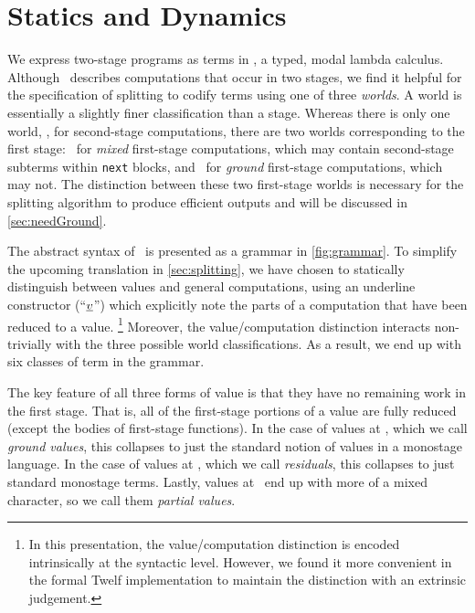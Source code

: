 
\section{\texorpdfstring{\lang}{λ12} Statics and Dynamics}
\label{sec:semantics}



We express two-stage programs as terms in \lang, a typed, modal lambda calculus. 
Although \lang\ describes computations that occur in two stages,
we find it helpful for the specification of splitting to codify terms using one of three \emph{worlds}.
A world is essentially a slightly finer classification than a stage.
Whereas there is only one world, \bbtwo, for second-stage computations,
there are two worlds corresponding to the first stage:
\bbonem\ for \emph{mixed} first-stage computations, which may contain second-stage subterms within {\tt next} blocks,
and \bbonep\ for \emph{ground} first-stage computations, which may not.
The distinction between these two first-stage worlds is necessary 
for the splitting algorithm to produce efficient outputs
and will be discussed in \ref{sec:needGround}.

The abstract syntax of \lang\ is presented as a grammar in \ref{fig:grammar}.  
To simplify the upcoming translation in \ref{sec:splitting}, 
we have chosen to statically distinguish between values and general computations,
using an underline constructor (``$\underline{\smash{v}}$'') which explicitly note the parts of a computation that have been reduced to a value.%
\footnote{In this presentation, the value/computation distinction is encoded intrinsically at the syntactic level.
However, we found it more convenient in the formal Twelf implementation to maintain the distinction with an extrinsic judgement.}
Moreover, the value/computation distinction interacts non-trivially with the three possible world classifications.
As a result, we end up with six classes of term in the grammar.

The key feature of all three forms of value is that they have no remaining work in the first stage.
That is, all of the first-stage portions of a value are fully reduced (except the bodies of first-stage functions).
In the case of values at \bbonep, which we call \emph{ground values}, this collapses to just the standard notion of values in a monostage language.
In the case of values at \bbtwo, which we call \emph{residuals}, this collapses to just standard monostage terms.
Lastly, values at \bbonem\ end up with more of a mixed character, so we call them \emph{partial values}.

